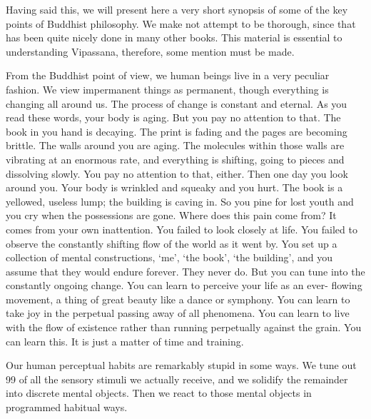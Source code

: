 Having said this, we will present here a very short synopsis of some of the key
points of Buddhist philosophy. We make not attempt to be thorough, since that
has been quite nicely done in many other books. This material is essential to
understanding Vipassana, therefore, some mention must be made.

From the Buddhist point of view, we human beings live in a very peculiar
fashion. We view impermanent things as permanent, though everything is changing
all around us. The process of change is constant and eternal. As you read these
words, your body is aging. But you pay no attention to that. The book in you
hand is decaying. The print is fading and the pages are becoming brittle. The
walls around you are aging. The molecules within those walls are vibrating at an
enormous rate, and everything is shifting, going to pieces and dissolving
slowly. You pay no attention to that, either. Then one day you look around you.
Your body is wrinkled and squeaky and you hurt. The book is a yellowed, useless
lump; the building is caving in. So you pine for lost youth and you cry when the possessions
are gone. Where does this pain come from? It comes from your own inattention.
You failed to look closely at life. You failed to observe the constantly
shifting flow of the world as it went by. You set up a collection of mental
constructions, `me', `the book', `the building', and you assume that they would
endure forever. They never do. But you can tune into the constantly ongoing
change. You can learn to perceive your life as an ever- flowing movement, a
thing of great beauty like a dance or symphony. You can learn to take joy in the
perpetual passing away of all phenomena. You can learn to live with the flow of
existence rather than running perpetually against the grain. You can learn this.
It is just a matter of time and training.

Our human perceptual habits are remarkably stupid in some ways. We tune out 99%
of all the sensory stimuli we actually receive, and we solidify the remainder
into discrete mental objects. Then we react to those mental objects in
programmed habitual ways.

